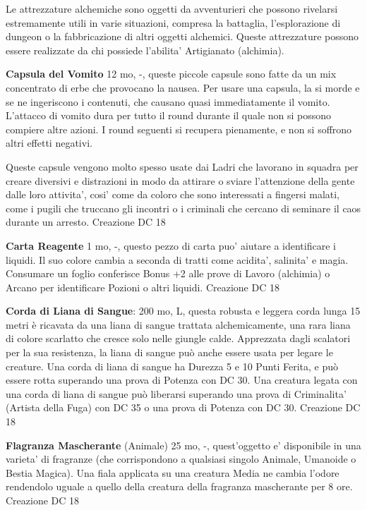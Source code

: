 \documentclass[a4paper,11pt,twoside,openany]{book}
\begin{document}
{		\label{attrezzature-alchemiche}
		
		Le attrezzature alchemiche sono oggetti da avventurieri che possono rivelarsi estremamente utili in varie situazioni, compresa la battaglia, l'esplorazione di dungeon o la fabbricazione di altri oggetti alchemici. Queste attrezzature possono essere realizzate da chi possiede l'abilita' Artigianato (alchimia).
		
		\textbf{Capsula del Vomito} 12 mo, -, queste piccole capsule sono fatte da un mix concentrato di erbe che provocano la nausea. Per usare una capsula, la si morde e se ne ingeriscono i contenuti, che causano quasi immediatamente il vomito. L'attacco di vomito dura per tutto il round durante il quale non si possono compiere altre azioni. I round seguenti si recupera pienamente, e non si soffrono altri effetti negativi.
		
		Queste capsule vengono molto spesso usate dai Ladri che lavorano in squadra per creare diversivi e distrazioni in modo da attirare o sviare l'attenzione della gente dalle loro attivita', cosi' come da coloro che sono interessati a fingersi malati, come i pugili che truccano gli incontri o i criminali che cercano di seminare il caos durante un arresto. Creazione DC 18
		
		\textbf{Carta Reagente} 1 mo, -, questo pezzo di carta puo' aiutare a identificare i liquidi. Il suo colore cambia a seconda di tratti come acidita', salinita' e magia. Consumare un foglio conferisce Bonus +2 alle prove di Lavoro (alchimia) o Arcano per identificare Pozioni o altri liquidi. Creazione DC 18
		
		\textbf{Corda di Liana di Sangue}: 200 mo, L, questa robusta e leggera corda lunga 15 metri è ricavata da una liana di sangue trattata alchemicamente, una rara liana di colore scarlatto che cresce solo nelle giungle calde.
		Apprezzata dagli scalatori per la sua resistenza, la liana di sangue può anche essere usata per legare le creature. Una corda di liana di sangue ha Durezza 5 e 10 Punti Ferita, e può essere rotta superando una prova di Potenza con DC 30.
		Una creatura legata con una corda di liana di sangue può liberarsi superando una prova di Criminalita’ (Artista della Fuga) con DC 35 o una prova di Potenza con DC 30. Creazione DC 18
		
		\textbf{Flagranza Mascherante} (Animale) 25 mo, -, quest'oggetto e' disponibile in una varieta' di fragranze (che corrispondono a qualsiasi singolo Animale, Umanoide o Bestia Magica). Una fiala applicata su una creatura Media ne cambia l'odore rendendolo uguale a quello della creatura della fragranza mascherante per 8 ore. Creazione DC 18
		
}
\end{document}
